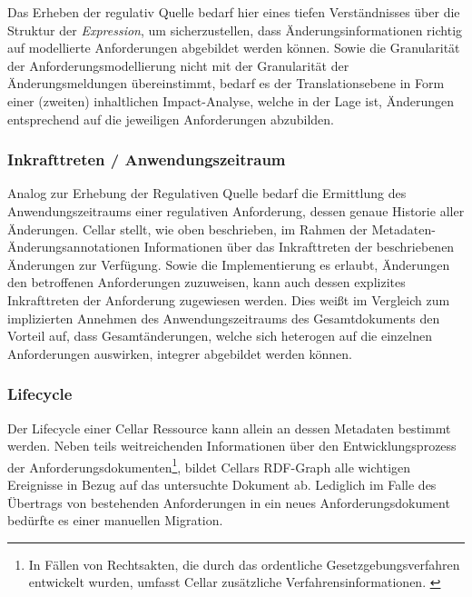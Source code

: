     \medskip
    Das Erheben der regulativ Quelle bedarf hier eines tiefen Verständnisses über die Struktur der \textit{Expression}, um sicherzustellen, dass Änderungsinformationen richtig auf modellierte Anforderungen abgebildet werden können.
    Sowie die Granularität der Anforderungsmodellierung nicht mit der Granularität der Änderungsmeldungen übereinstimmt, bedarf es der Translationsebene in Form einer (zweiten) inhaltlichen Impact-Analyse, welche in der Lage ist, Änderungen entsprechend auf die jeweiligen Anforderungen abzubilden.
    

\subsubsection{Inkrafttreten / Anwendungszeitraum}

    Analog zur Erhebung der Regulativen Quelle bedarf die Ermittlung des Anwendungszeitraums einer regulativen Anforderung, dessen genaue Historie aller Änderungen.
    Cellar stellt, wie oben beschrieben, im Rahmen der Metadaten-Änderungsannotationen Informationen über das Inkrafttreten der beschriebenen Änderungen zur Verfügung.
    Sowie die Implementierung es erlaubt, Änderungen den betroffenen Anforderungen zuzuweisen, kann auch dessen explizites Inkrafttreten der Anforderung zugewiesen werden.
    Dies weißt im Vergleich zum implizierten Annehmen des Anwendungszeitraums des Gesamtdokuments den Vorteil auf, dass Gesamtänderungen, welche sich heterogen auf die einzelnen Anforderungen auswirken, integrer abgebildet werden können.
    
\subsubsection{Lifecycle}

    Der Lifecycle einer Cellar Ressource kann allein an dessen Metadaten bestimmt werden.
    Neben teils weitreichenden Informationen über den Entwicklungsprozess der Anforderungsdokumenten\footnote{In Fällen von Rechtsakten, die durch das ordentliche Gesetzgebungsverfahren entwickelt wurden, umfasst Cellar zusätzliche Verfahrensinformationen. \cite[vgl.][]{2004R0552}}, bildet Cellars \ac{RDF}-Graph alle wichtigen Ereignisse in Bezug auf das untersuchte Dokument ab.  
    Lediglich im Falle des Übertrags von bestehenden Anforderungen in ein neues Anforderungsdokument bedürfte es einer manuellen Migration.

